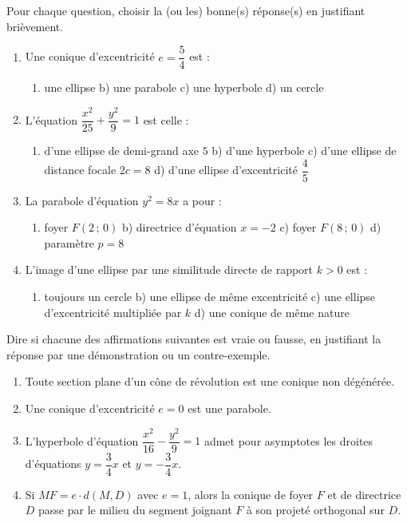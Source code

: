 \documentclass[11pt]{article}
\begin{document}
\begin{exercice}
Pour chaque question, choisir la (ou les) bonne(s) réponse(s) en justifiant brièvement.
\begin{enumerate}
\item Une conique d'excentricité $e = \dfrac{5}{4}$ est :
\begin{enumerate}
\item une ellipse \quad b) une parabole \quad c) une hyperbole \quad d) un cercle
\end{enumerate}
\item L'équation $\dfrac{x^{2}}{25} + \dfrac{y^{2}}{9} = 1$ est celle :
\begin{enumerate}
\item d'une ellipse de demi-grand axe $5$ \quad b) d'une hyperbole \quad c) d'une ellipse de distance focale $2c = 8$ \quad d) d'une ellipse d'excentricité $\dfrac{4}{5}$
\end{enumerate}
\item La parabole d'équation $y^{2} = 8x$ a pour :
\begin{enumerate}
\item foyer $F(2\,;\,0)$ \quad b) directrice d'équation $x = -2$ \quad c) foyer $F(8\,;\,0)$ \quad d) paramètre $p = 8$
\end{enumerate}
\item L'image d'une ellipse par une similitude directe de rapport $k > 0$ est :
\begin{enumerate}
\item toujours un cercle \quad b) une ellipse de même excentricité \quad c) une ellipse d'excentricité multipliée par $k$ \quad d) une conique de même nature
\end{enumerate}
\end{enumerate}
\end{exercice}

\begin{exercice}
Dire si chacune des affirmations suivantes est vraie ou fausse, en justifiant la réponse par une démonstration ou un contre-exemple.
\begin{enumerate}
\item Toute section plane d'un cône de révolution est une conique non dégénérée.
\item Une conique d'excentricité $e = 0$ est une parabole.
\item L'hyperbole d'équation $\dfrac{x^{2}}{16} - \dfrac{y^{2}}{9} = 1$ admet pour asymptotes les droites d'équations $y = \dfrac{3}{4}x$ et $y = -\dfrac{3}{4}x$.
\item Si $MF = e \cdot d(M, D)$ avec $e = 1$, alors la conique de foyer $F$ et de directrice $D$ passe par le milieu du segment joignant $F$ à son projeté orthogonal sur $D$.
\end{enumerate}
\end{exercice}
\end{document}
